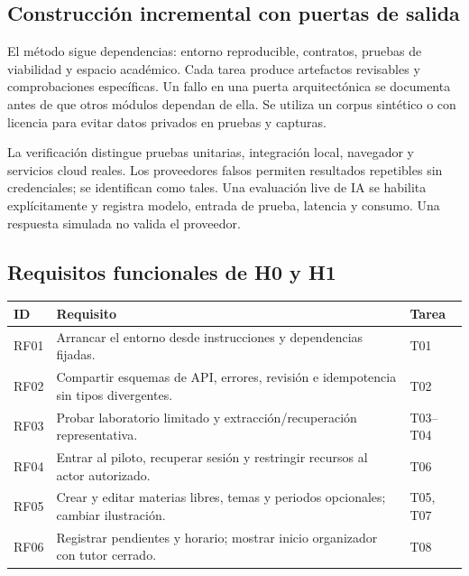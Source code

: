 \subsection{Construcción incremental con puertas de salida}
El método sigue dependencias: entorno reproducible, contratos, pruebas de viabilidad y espacio académico. Cada tarea produce artefactos revisables y comprobaciones específicas. Un fallo en una puerta arquitectónica se documenta antes de que otros módulos dependan de ella. Se utiliza un corpus sintético o con licencia para evitar datos privados en pruebas y capturas.

La verificación distingue pruebas unitarias, integración local, navegador y servicios cloud reales. Los proveedores falsos permiten resultados repetibles sin credenciales; se identifican como tales. Una evaluación live de IA se habilita explícitamente y registra modelo, entrada de prueba, latencia y consumo. Una respuesta simulada no valida el proveedor.

\subsection{Requisitos funcionales de H0 y H1}
\small
\begin{tabularx}{\linewidth}{P{1cm}Y P{2cm}}
\toprule
\textbf{ID} & \textbf{Requisito} & \textbf{Tarea}\\
\midrule
RF01 & Arrancar el entorno desde instrucciones y dependencias fijadas. & T01\\
RF02 & Compartir esquemas de API, errores, revisión e idempotencia sin tipos divergentes. & T02\\
RF03 & Probar laboratorio limitado y extracción/recuperación representativa. & T03--T04\\
RF04 & Entrar al piloto, recuperar sesión y restringir recursos al actor autorizado. & T06\\
RF05 & Crear y editar materias libres, temas y periodos opcionales; cambiar ilustración. & T05, T07\\
RF06 & Registrar pendientes y horario; mostrar inicio organizador con tutor cerrado. & T08\\
\bottomrule
\end{tabularx}
\normalsize
